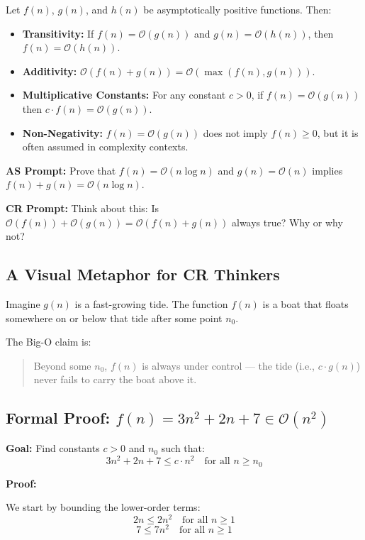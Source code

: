 \documentclass{article}
\begin{document}
Let $f(n)$, $g(n)$, and $h(n)$ be asymptotically positive functions. Then:

\begin{itemize}
    \item \textbf{Transitivity:} If $f(n) = \mathcal{O}(g(n))$ and $g(n) = \mathcal{O}(h(n))$, then $f(n) = \mathcal{O}(h(n))$.
    \item \textbf{Additivity:} $\mathcal{O}(f(n) + g(n)) = \mathcal{O}(\max(f(n), g(n)))$.
    \item \textbf{Multiplicative Constants:} For any constant $c > 0$, if $f(n) = \mathcal{O}(g(n))$ then $c \cdot f(n) = \mathcal{O}(g(n))$.
    \item \textbf{Non-Negativity:} $f(n) = \mathcal{O}(g(n))$ does not imply $f(n) \ge 0$, but it is often assumed in complexity contexts.
\end{itemize}

\textbf{AS Prompt:} Prove that $f(n) = \mathcal{O}(n \log n)$ and $g(n) = \mathcal{O}(n)$ implies $f(n) + g(n) = \mathcal{O}(n \log n)$.

\textbf{CR Prompt:} Think about this: Is $\mathcal{O}(f(n)) + \mathcal{O}(g(n)) = \mathcal{O}(f(n) + g(n))$ always true? Why or why not?

\subsection*{A Visual Metaphor for CR Thinkers}

Imagine $g(n)$ is a fast-growing tide. The function $f(n)$ is a boat that floats somewhere on or below that tide after some point $n_0$.

The Big-O claim is:
\begin{quote}
Beyond some $n_0$, $f(n)$ is always under control — the tide (i.e., $c \cdot g(n)$) never fails to carry the boat above it.
\end{quote}


\subsection*{Formal Proof: $f(n) = 3n^2 + 2n + 7 \in \mathcal{O}(n^2)$}

\textbf{Goal:} Find constants $c > 0$ and $n_0$ such that:
\[
3n^2 + 2n + 7 \le c \cdot n^2 \quad \text{for all } n \ge n_0
\]

\textbf{Proof:}

We start by bounding the lower-order terms:
\[
2n \le 2n^2 \quad \text{for all } n \ge 1
\]
\[
7 \le 7n^2 \quad \text{for all } n \ge 1
\]
\end{document}
